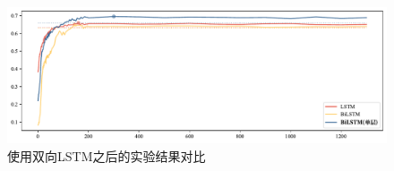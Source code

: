 \begin{figure}[htb]
	\centering
	\includegraphics[width=0.75\linewidth]{images/bidirectional.pdf}
	\caption{使用双向LSTM之后的实验结果对比}
	\label{fig:bidirectional2}
\end{figure}